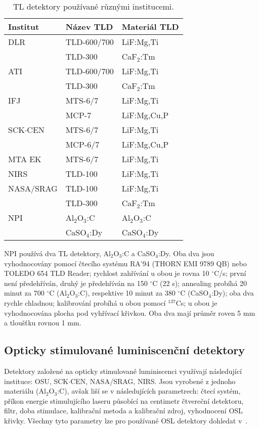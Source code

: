 \begin{table}[H]
  \def\arraystretch{0.8}
  \centering
  \caption{TL detektory používané různými institucemi. \cite{dosis}}
  \label{tab:dosis_pouzivaneTLD}
  \begin{tabular}{lll}
	\toprule
Institut&Název TLD&Materiál TLD\\
\midrule
DLR			 &TLD-600/700  &LiF:Mg,Ti\\
			 &TLD-300	   &CaF$_2$:Tm\\
ATI			 &TLD-600/700  &LiF:Mg,Ti\\
			 &TLD-300	   &CaF$_2$:Tm\\
IFJ			 &MTS-6/7	   &LiF:Mg,Ti\\
			 &MCP-7		   &LiF:Mg,Cu,P\\
SCK$\cdot$CEN&MTS-6/7	   &LiF:Mg,Ti\\
			 &MCP-6/7	   &LiF:Mg,Cu,P\\
MTA EK		 &MTS-6/7	   &LiF:Mg,Ti\\
NIRS		 &TLD-100	   &LiF:Mg,Ti\\
NASA/SRAG	 &TLD-100	   &LiF:Mg,Ti\\
			 &TLD-300	   &CaF$_2$:Tm\\
NPI			 &Al$_2$O$_3$:C&Al$_2$O$_3$:C\\
			 &CaSO$_4$:Dy  &CaSO$_4$:Dy\\
	\bottomrule
  \end{tabular}
\end{table}

NPI používá dva TL detektory, Al$_2$O$_3$:C a CaSO$_4$:Dy. Oba dva jsou vyhodnocovány pomocí čtecího systému RA’94 (THORN EMI 9789 QB) nebo TOLEDO 654 TLD Reader; rychlost zahřívání u obou je rovna 10 $^{\circ}$C/s; první není předehříván, druhý je předehříván na 150 $^{\circ}$C (22 s); annealing probíhá 20 minut za 700 $^{\circ}$C (Al$_2$O$_3$:C), respektive 10 minut za 380 $^{\circ}$C (CaSO$_4$:Dy); oba dva rychle chladnou; kalibrování probíhá u obou pomocí $^{137}$Cs; u obou je vyhodnocována plocha pod vyhřívací křivkou. Oba dva mají průměr roven 5 mm a tloušťku rovnou 1 mm.
\subsection{Opticky stimulované luminiscenční detektory}
Detektory založené na opticky stimulované luminiscenci využívají následující instituce: OSU, SCK$\cdot$CEN, NASA/SRAG, NIRS. Jsou vyrobené z jednoho materiálu (Al$_2$O$_3$:C), avšak liší se v následujících parametrech: čtecí systém, příkon energie stimulujícího laseru působící na centimetr čtvereční detektoru, filtr, doba stimulace, kalibrační metoda a kalibrační zdroj, vyhodnocení OSL křivky. Všechny tyto parametry lze pro používané OSL detektory dohledat v~\cite{dosis}. 

